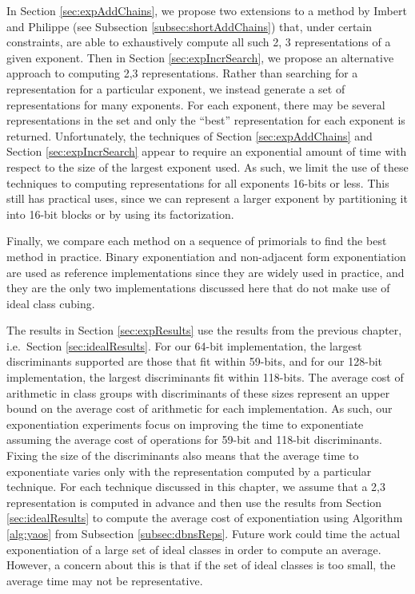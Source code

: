 \documentclass{ucalgthes1}
\theoremstyle{definition}
\begin{document}
In Section \ref{sec:expAddChains}, we propose two extensions to a method by Imbert and Philippe \mbox{\cite[\S 3]{Imbert2010b}} (see Subsection \ref{subsec:shortAddChains}) that, under certain constraints, are able to exhaustively compute all such 2, 3 representations of a given exponent.  Then in Section \ref{sec:expIncrSearch}, we propose an alternative approach to computing 2,3 representations.  Rather than searching for a representation for a particular exponent, we instead generate a set of representations for many exponents.  For each exponent, there may be several representations in the set and only the ``best'' representation for each exponent is returned.  Unfortunately, the techniques of Section \ref{sec:expAddChains} and Section \ref{sec:expIncrSearch} appear to require an exponential amount of time with respect to the size of the largest exponent used.  As such, we limit the use of these techniques to computing representations for all exponents 16-bits or less.  This still has practical uses, since we can represent a larger exponent by partitioning it into 16-bit blocks or by using its factorization.

Finally, we compare each method on a sequence of primorials to find the best method in practice.  Binary exponentiation and non-adjacent form exponentiation are used as reference implementations since they are widely used in practice, and they are the only two implementations discussed here that do not make use of ideal class cubing.

The results in Section \ref{sec:expResults} use the results from the previous chapter, i.e.\ Section \ref{sec:idealResults}.  For our 64-bit implementation, the largest discriminants supported are those that fit within 59-bits, and for our 128-bit implementation, the largest discriminants fit within 118-bits.  The average cost of arithmetic in class groups with discriminants of these sizes represent an upper bound on the average cost of arithmetic for each implementation.  As such, our exponentiation experiments focus on improving the time to exponentiate assuming the average cost of operations for 59-bit and 118-bit discriminants.  Fixing the size of the discriminants also means that the average time to exponentiate varies only with the representation computed by a particular technique.  For each technique discussed in this chapter, we assume that a 2,3 representation is computed in advance and then use the results from Section \ref{sec:idealResults} to compute the average cost of exponentiation using Algorithm \ref{alg:yaos} from Subsection \ref{subsec:dbnsReps}.  Future work could time the actual exponentiation of a large set of ideal classes in order to compute an average.  However, a concern about this is that if the set of ideal classes is too small, the average time may not be representative.
\end{document}
